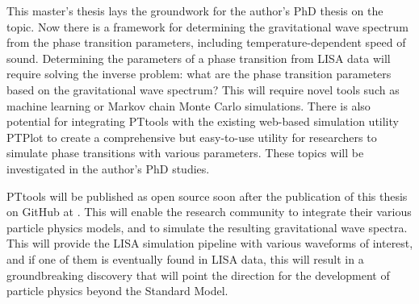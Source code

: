 This master's thesis lays the groundwork for the author's PhD thesis on the topic.
Now there is a framework for determining the gravitational wave spectrum from the phase transition parameters, including temperature-dependent speed of sound.
Determining the parameters of a phase transition from LISA data will require solving the inverse problem: what are the phase transition parameters based on the gravitational wave spectrum?
This will require novel tools such as machine learning or Markov chain Monte Carlo simulations.
There is also potential for integrating PTtools with the existing web-based simulation utility PTPlot to create a comprehensive but easy-to-use utility for researchers to simulate phase transitions with various parameters.
These topics will be investigated in the author's PhD studies.

PTtools will be published as open source soon after the publication of this thesis on GitHub at \cite{pttools}.
This will enable the research community to integrate their various particle physics models,
and to simulate the resulting gravitational wave spectra.
This will provide the LISA simulation pipeline with various waveforms of interest,
and if one of them is eventually found in LISA data,
this will result in a groundbreaking discovery
that will point the direction for the development of particle physics beyond the Standard Model.
